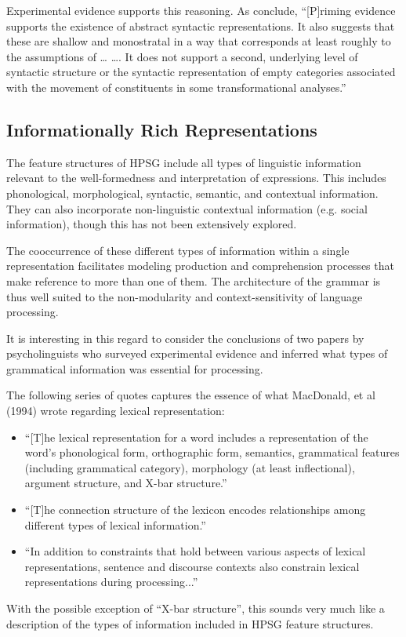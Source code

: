 \documentclass[a4paper]{article}
\begin{document}
Experimental evidence supports this reasoning.  As \citet{BraniganPickering2017} conclude,
``[P]riming evidence supports the existence of abstract syntactic representations. It also suggests
that these are shallow and monostratal in a way that corresponds at least roughly to the assumptions
of \ldots{} \citet{ps2} \ldots{}. It does not support a second, underlying level of syntactic
structure or the syntactic representation of empty categories associated with the movement of
constituents in some transformational analyses.''

\subsection{Informationally Rich Representations}

The feature structures of HPSG include all
types of linguistic information relevant to the well-formedness and interpretation
of expressions. This includes phonological, morphological, syntactic, semantic, and contextual information.  They can also incorporate non-linguistic contextual information (e.g. social information), though this has not been extensively explored.

The cooccurrence of these different types of information within a single representation facilitates modeling production and comprehension processes that make reference to more than one of them.  The architecture of the grammar is thus well suited to the non-modularity and context-sensitivity of language processing.  

It is interesting in this regard to consider the conclusions of two papers by psycholinguists who surveyed experimental evidence and inferred what types of grammatical information was essential for processing.  

The following series of quotes captures the essence of what MacDonald, et al (1994) wrote regarding lexical representation:
\begin{itemize} 
\item ``[T]he lexical
representation for a word includes a representation of the
word's phonological form, orthographic form, semantics,
grammatical features (including grammatical category), morphology
(at least inflectional), argument structure, and X-bar
structure.''
\item ``[T]he connection
structure of the lexicon encodes relationships among
different types of lexical information.''
\item
``In addition to constraints that hold between various aspects
of lexical representations, sentence and discourse contexts also
constrain lexical representations during processing...''
\end{itemize}
With the possible exception of ``X-bar structure'', this sounds very much like a description of the types of information included in HPSG feature structures.
\end{document}
